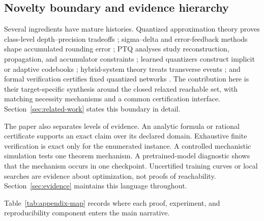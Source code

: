 \documentclass[twoside,11pt]{article}
\begin{document}
\subsection{Novelty boundary and evidence hierarchy}
\label{sec:novelty-boundary-intro}

Several ingredients have mature histories.  Quantized approximation theory
proves class-level depth--precision tradeoffs
\citep{BlumenfeldGilboaSoudry2019,OuSchenkelBolcskei2024}; sigma--delta and
error-feedback methods shape accumulated rounding error
\citep{DaubechiesDeVore2003,Gunturk2003,KrahmerSaabWard2012,OConnorWelling2017};
PTQ analyses study reconstruction, propagation, and accumulator constraints
\citep{ZhangZhouSaab2023PTQ,ColbertEtAl2024AXE,ZhangEtAl2025ProvablePTQ,ZhangEtAl2026Qronos};
learned quantizers construct implicit or adaptive codebooks
\citep{HuijbenEtAl2024QINCo,ZhongEtAl2026RQMoE}; hybrid-system theory treats
transverse events \citep{BurdenEtAl2016EventSelected,KongEtAl2024Saltation};
and formal verification certifies fixed quantized networks
\citep{TeuberEtAl2021Equivalence,HuangEtAl2024QNNVerify}.  The contribution
here is their target-specific synthesis around the closed relaxed reachable
set, with matching necessity mechanisms and a common certification interface.
Section~\ref{sec:related-work} states this boundary in detail.

The paper also separates levels of evidence.  An analytic formula or rational
certificate supports an exact claim over its declared domain.  Exhaustive
finite verification is exact only for the enumerated instance.  A controlled
mechanistic simulation tests one theorem mechanism.  A pretrained-model
diagnostic shows that the mechanism occurs in one checkpoint.  Uncertified
training curves or local searches are evidence about optimization, not proofs
of reachability.  Section~\ref{sec:evidence} maintains this language throughout.

Table~\ref{tab:appendix-map} records where each proof, experiment, and reproducibility component enters the main narrative.
\end{document}
